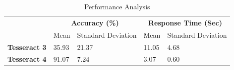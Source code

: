 		
\begin{table}[]
\centering
\caption{Performance Analysis}
\label{performanceAnalysis}
\begin{tabular}{l|l|l|l|l|}
\cline{2-5}
\multirow{2}{*}{}                          & \multicolumn{2}{c|}{\textbf{Accuracy (\%)}} & \multicolumn{2}{c|}{\textbf{Response Time (Sec)}} \\ \cline{2-5} 
                                           & Mean           & Standard Deviation         & Mean              & Standard Deviation            \\ \hline
\multicolumn{1}{|l|}{\textbf{Tesseract 3}} & 35.93          & 21.37                      & 11.05             & 4.68                          \\ \hline
\multicolumn{1}{|l|}{\textbf{Tesseract 4}} & 91.07          & 7.24                       & 3.07              & 0.60                          \\ \hline
\end{tabular}
\end{table}